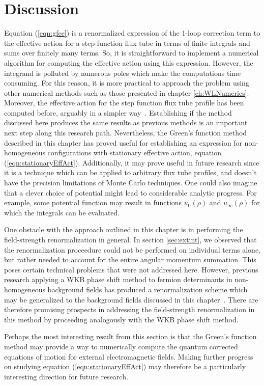 \section{Discussion}
Equation (\ref{eqn:gfee}) is a renormalized expression of the 1-loop correction term to the effective 
action for a step-function flux tube in terms of finite integrals and sums over finitely many terms. 
So, it is straightforward to implement a numerical algorithm for computing the effective action using 
this expression. However,  the integrand is polluted by numerous poles
which make the computations time consuming. For this reason, it is more practical to approach the problem 
using other numerical methods such as those presented in chapter \ref{ch:WLNumerics}. 
Moreover, the effective action for the step function flux tube profile 
has been computed before, arguably in a simpler way~\cite{1999PhRvD..60j5019B}. 
Establishing if the method discussed here produces the same results as 
previous methods is an important next step along this research path.
Nevertheless, the Green's function 
method described in this chapter has proved useful for 
establishing an expression for non-homogeneous 
configurations with stationary effective action, equation 
(\ref{eqn:stationaryEffAct}). Additionally, it may 
prove useful in future research since it is a technique which 
can be applied to arbitrary flux tube 
profiles, and doesn't have the precision limitations of Monte Carlo 
techniques. One could also imagine that 
a clever choice of potential might lead to considerable analytic 
progress. For example, some 
potential function 
may result in functions $u_0(\rho)$ and $u_\infty(\rho)$ for 
which the integrals can be evaluated.

One obstacle with the approach outlined in this chapter is in performing 
the field-strength renormalization in general. In section \ref{sec:extint}, we 
observed that the renormalization proceedure could not be performed on individual 
terms alone, but rather needed to account for the entire angular momentum summation.
This poses certain technical problems that were not addressed here. However, previous 
research applying a WKB phase shift method to fermion determinants in non-homogeneous 
background fields has produced a renormalization scheme which may be generalized to 
the background fields discussed in this chapter~\cite{2004PhLB..600..302D}. 
There are therefore promising prospects in addressing the field-strength renormalization 
in this method by proceeding analogously with the WKB phase shift method.

Perhaps the most interesting result from this section is that 
the Green's function method may provide 
a way to numerically compute the
quantum corrected equations of motion for external 
electromagnetic fields. Making further progress on studying 
equation (\ref{eqn:stationaryEffAct}) may therefore be a
particularly interesting direction for future research.

